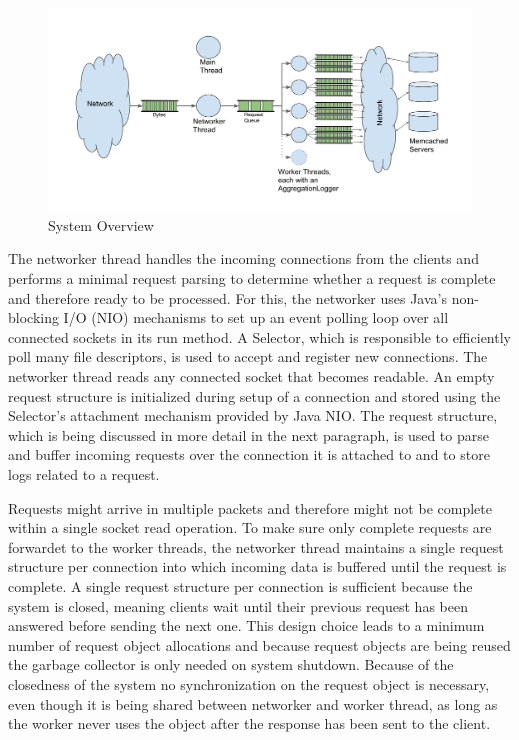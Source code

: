 \documentclass[11pt,a4paper]{article}
\begin{document}
\begin{figure}
    \includegraphics[width=.8\linewidth]{plots/SystemOverview.svg}
    \caption{System Overview}
    \label{fig:Overview}
\end{figure}


The networker thread handles the incoming connections from the clients and performs a minimal request parsing to determine whether a request is complete and therefore ready to be processed.
For this, the networker uses Java's non-blocking I/O (NIO) mechanisms to set up an event polling loop over all connected sockets in its run method.
A Selector, which is responsible to efficiently poll many file descriptors, is used to accept and register new connections.
The networker thread reads any connected socket that becomes readable.
An empty request structure is initialized during setup of a connection and stored using the Selector's attachment mechanism provided by Java NIO.
The request structure, which is being discussed in more detail in the next paragraph, is used to parse and buffer incoming requests over the connection it is attached to and to store logs related to a request.

Requests might arrive in multiple packets and therefore might not be complete within a single socket read operation.
To make sure only complete requests are forwardet to the worker threads, the networker thread maintains a single request structure per connection into which incoming data is buffered until the request is complete.
A single request structure per connection is sufficient because the system is closed, meaning clients wait until their previous request has been answered before sending the next one.
This design choice leads to a minimum number of request object allocations and because request objects are being reused the garbage collector is only needed on system shutdown.
Because of the closedness of the system no synchronization on the request object is necessary, even though it is being shared between networker and worker thread, as long as the worker never uses the object after the response has been sent to the client.
\end{document}
